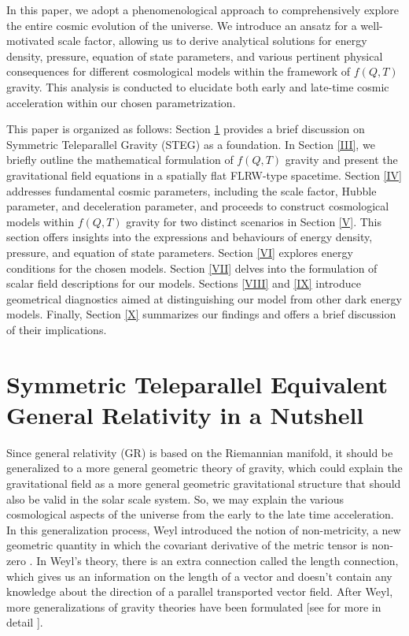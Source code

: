 \documentclass[aps,prd,showpacs,nofootinbib,floats,floatfix,preprintnumbers,groupedaddress,twocolumn]{revtex4-1}
\begin{document}
    In this paper, we adopt a phenomenological approach to comprehensively explore the entire cosmic evolution of the universe. We introduce an ansatz for a well-motivated scale factor, allowing us to derive analytical solutions for energy density, pressure, equation of state parameters, and various pertinent physical consequences for different cosmological models within the framework of $f(Q,T)$ gravity. This analysis is conducted to elucidate both early and late-time cosmic acceleration within our chosen parametrization.

    This paper is organized as follows: Section \ref{II} provides a brief discussion on Symmetric Teleparallel Gravity (STEG) as a foundation. In Section \ref{III}, we briefly outline the mathematical formulation of $f(Q,T)$ gravity and present the gravitational field equations in a spatially flat FLRW-type spacetime. Section \ref{IV} addresses fundamental cosmic parameters, including the scale factor, Hubble parameter, and deceleration parameter, and proceeds to construct cosmological models within $f(Q,T)$ gravity for two distinct scenarios in Section \ref{V}. This section offers insights into the expressions and behaviours of energy density, pressure, and equation of state parameters. Section \ref{VI} explores energy conditions for the chosen models. Section \ref{VII} delves into the formulation of scalar field descriptions for our models. Sections \ref{VIII} and \ref{IX} introduce geometrical diagnostics aimed at distinguishing our model from other dark energy models. Finally, Section \ref{X} summarizes our findings and offers a brief discussion of their implications.



    
\section{Symmetric Teleparallel Equivalent General Relativity in a Nutshell}\label{II}
\noindent
    Since general relativity (GR) is based on the Riemannian manifold, it should be generalized to a more general geometric theory of gravity, which could explain the gravitational field as a more general geometric gravitational structure that should also be valid in the solar scale system. So, we may explain the various cosmological aspects of the universe from the early to the late time acceleration. In this generalization process, Weyl introduced the notion of non-metricity, a new geometric quantity in which the covariant derivative of the metric tensor is non-zero \cite{Weyl/1918}. In Weyl's theory, there is an extra connection called the length connection, which gives us an information on the length of a vector and doesn't contain any knowledge about the direction of a parallel transported vector field. After Weyl, more generalizations of gravity theories have been formulated [see for more in detail \cite{Di,Von,D,Z,M1,T,L,J,Z1,Z2}].
\end{document}
